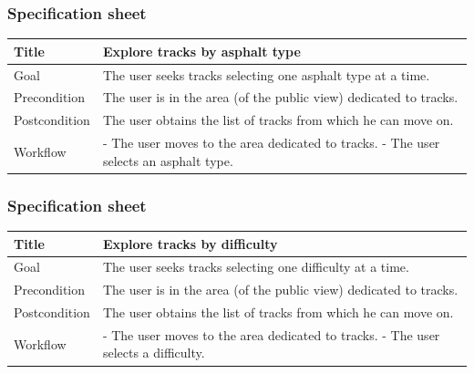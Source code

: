\documentclass{beamer}
\begin{document}
\begin{frame}
    \frametitle{Specification sheet}
    \begin{table}
        \tiny
        \begin{tabular}{|p{2cm}|p{6cm}|}
        \hline
        Title & \textbf{Explore tracks by asphalt type} \\
        \hline
        Goal & The user seeks tracks selecting one asphalt type at a time. \\
        \hline
        Precondition & The user is in the area (of the public view) dedicated to tracks.\\
        \hline
        Postcondition & The user obtains the list of tracks from which he can move on.\\
        \hline
        Workflow &
        - The user moves to the area dedicated to tracks. \newline
        - The user selects an asphalt type. \\
        \hline
        \end{tabular}
\end{table}
\end{frame}

\begin{frame}
    \frametitle{Specification sheet}
    \begin{table}
        \tiny
        \begin{tabular}{|p{2cm}|p{6cm}|}
        \hline
        Title & \textbf{Explore tracks by difficulty} \\
        \hline
        Goal & The user seeks tracks selecting one difficulty at a time. \\
        \hline
        Precondition & The user is in the area (of the public view) dedicated to tracks.\\
        \hline
        Postcondition & The user obtains the list of tracks from which he can move on.\\
        \hline
        Workflow &
        - The user moves to the area dedicated to tracks. \newline
        - The user selects a difficulty. \\
        \hline
        \end{tabular}
\end{table}
\end{frame}
\end{document}

